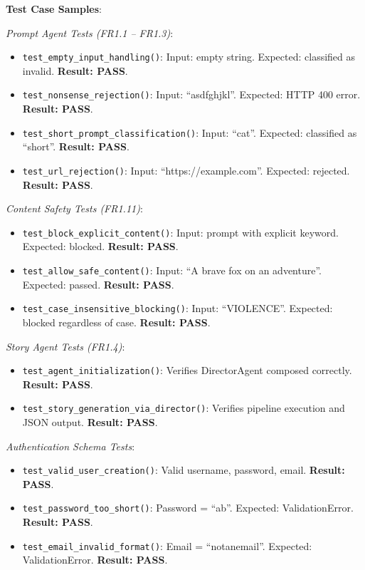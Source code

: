 \textbf{Test Case Samples}:

\textit{Prompt Agent Tests (FR1.1 -- FR1.3)}:
\begin{itemize}
    \item \texttt{test\_empty\_input\_handling()}: Input: empty string. Expected: classified as invalid. \textbf{Result: PASS}.
    \item \texttt{test\_nonsense\_rejection()}: Input: ``asdfghjkl''. Expected: HTTP 400 error. \textbf{Result: PASS}.
    \item \texttt{test\_short\_prompt\_classification()}: Input: ``cat''. Expected: classified as ``short''. \textbf{Result: PASS}.
    \item \texttt{test\_url\_rejection()}: Input: ``https://example.com''. Expected: rejected. \textbf{Result: PASS}.
\end{itemize}

\textit{Content Safety Tests (FR1.11)}:
\begin{itemize}
    \item \texttt{test\_block\_explicit\_content()}: Input: prompt with explicit keyword. Expected: blocked. \textbf{Result: PASS}.
    \item \texttt{test\_allow\_safe\_content()}: Input: ``A brave fox on an adventure''. Expected: passed. \textbf{Result: PASS}.
    \item \texttt{test\_case\_insensitive\_blocking()}: Input: ``VIOLENCE''. Expected: blocked regardless of case. \textbf{Result: PASS}.
\end{itemize}

\textit{Story Agent Tests (FR1.4)}:
\begin{itemize}
    \item \texttt{test\_agent\_initialization()}: Verifies DirectorAgent composed correctly. \textbf{Result: PASS}.
    \item \texttt{test\_story\_generation\_via\_director()}: Verifies pipeline execution and JSON output. \textbf{Result: PASS}.
\end{itemize}

\textit{Authentication Schema Tests}:
\begin{itemize}
    \item \texttt{test\_valid\_user\_creation()}: Valid username, password, email. \textbf{Result: PASS}.
    \item \texttt{test\_password\_too\_short()}: Password = ``ab''. Expected: ValidationError. \textbf{Result: PASS}.
    \item \texttt{test\_email\_invalid\_format()}: Email = ``notanemail''. Expected: ValidationError. \textbf{Result: PASS}.
\end{itemize}

